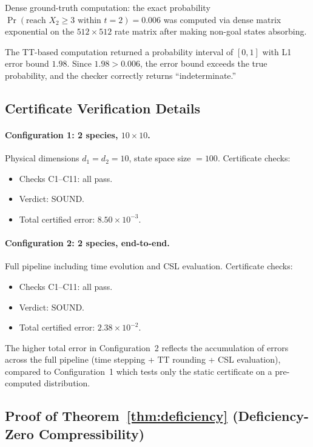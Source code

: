 \documentclass[11pt]{article}
\begin{document}
Dense ground-truth computation:
the exact probability
$\Pr(\text{reach } X_2 \geq 3 \text{ within } t=2) = 0.006$
was computed via dense matrix exponential on the $512 \times 512$
rate matrix after making non-goal states absorbing.

The TT-based computation returned a probability interval of $[0, 1]$
with L1 error bound $1.98$.
Since $1.98 > 0.006$, the error bound exceeds the true probability,
and the checker correctly returns ``indeterminate.''

\subsection{Certificate Verification Details}

\paragraph{Configuration 1: 2 species, $10 \times 10$.}
Physical dimensions $d_1 = d_2 = 10$, state space size $= 100$.
Certificate checks:
\begin{itemize}[itemsep=1pt]
\item Checks C1--C11: all pass.
\item Verdict: SOUND.
\item Total certified error: $8.50 \times 10^{-3}$.
\end{itemize}

\paragraph{Configuration 2: 2 species, end-to-end.}
Full pipeline including time evolution and CSL evaluation.
Certificate checks:
\begin{itemize}[itemsep=1pt]
\item Checks C1--C11: all pass.
\item Verdict: SOUND.
\item Total certified error: $2.38 \times 10^{-2}$.
\end{itemize}

The higher total error in Configuration~2 reflects the accumulation
of errors across the full pipeline (time stepping + TT rounding +
CSL evaluation), compared to Configuration~1 which tests only the
static certificate on a pre-computed distribution.

\subsection{Proof of Theorem~\ref{thm:deficiency} (Deficiency-Zero Compressibility)}
\end{document}
